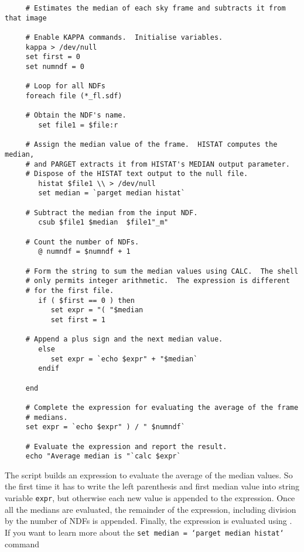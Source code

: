 \small
\begin{verbatim}
     # Estimates the median of each sky frame and subtracts it from that image

     # Enable KAPPA commands.  Initialise variables.
     kappa > /dev/null
     set first = 0
     set numndf = 0

     # Loop for all NDFs
     foreach file (*_fl.sdf)

     # Obtain the NDF's name.
        set file1 = $file:r

     # Assign the median value of the frame.  HISTAT computes the median,
     # and PARGET extracts it from HISTAT's MEDIAN output parameter.
     # Dispose of the HISTAT text output to the null file.
        histat $file1 \\ > /dev/null
        set median = `parget median histat`

     # Subtract the median from the input NDF.
        csub $file1 $median  $file1"_m" 

     # Count the number of NDFs.
        @ numndf = $numndf + 1

     # Form the string to sum the median values using CALC.  The shell
     # only permits integer arithmetic.  The expression is different
     # for the first file. 
        if ( $first == 0 ) then
           set expr = "( "$median
           set first = 1

     # Append a plus sign and the next median value.
        else
           set expr = `echo $expr" + "$median`
        endif

     end

     # Complete the expression for evaluating the average of the frame
     # medians.
     set expr = `echo $expr" ) / " $numndf`

     # Evaluate the expression and report the result.
     echo "Average median is "`calc $expr`
\end{verbatim}
\normalsize
The script builds an expression to evaluate the average of the median
values.  So the first time it has to write the left parenthesis and
first median value into string variable {\tt expr}, but otherwise each
new value is appended to the expression.  Once all the medians are
evaluated, the remainder of the expression, including division by the
number of NDFs is appended.  Finally, the expression is evaluated using
.  If you want to learn more about the
\mbox{\tt set median = `parget median histat`} command


